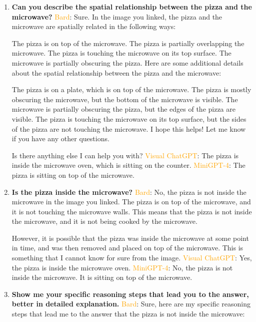     \begin{enumerate}
        \item \textbf{Can you describe the spatial relationship between the pizza and the microwave?}
        \subitem \textcolor{orange}{Bard}: 
        Sure. In the image you linked, the pizza and the microwave are spatially related in the following ways:
        
        The pizza is on top of the microwave.
        The pizza is partially overlapping the microwave.
        The pizza is touching the microwave on its top surface.
        The microwave is partially obscuring the pizza.
        Here are some additional details about the spatial relationship between the pizza and the microwave:
        
        The pizza is on a plate, which is on top of the microwave.
        The pizza is mostly obscuring the microwave, but the bottom of the microwave is visible.
        The microwave is partially obscuring the pizza, but the edges of the pizza are visible.
        The pizza is touching the microwave on its top surface, but the sides of the pizza are not touching the microwave.
        I hope this helps! Let me know if you have any other questions.
        
        Is there anything else I can help you with?
        \subitem \textcolor{orange}{Visual ChatGPT}: The pizza is inside the microwave oven, which is sitting on the counter.
        \subitem \textcolor{orange}{MiniGPT-4}: The pizza is sitting on top of the microwave.
        \item \textbf{Is the pizza inside the microwave?}
        \subitem \textcolor{orange}{Bard}: 
        No, the pizza is not inside the microwave in the image you linked. The pizza is on top of the microwave, and it is not touching the microwave walls. This means that the pizza is not inside the microwave, and it is not being cooked by the microwave.
        
        However, it is possible that the pizza was inside the microwave at some point in time, and was then removed and placed on top of the microwave. This is something that I cannot know for sure from the image.
        \subitem \textcolor{orange}{Visual ChatGPT}: Yes, the pizza is inside the microwave oven.
        \subitem \textcolor{orange}{MiniGPT-4}: No, the pizza is not inside the microwave. It is sitting on top of the microwave.
        \item \textbf{Show me your specific reasoning steps that lead you to the answer, better in detailed explanation.}
        \subitem \textcolor{orange}{Bard}: 
        Sure, here are my specific reasoning steps that lead me to the answer that the pizza is not inside the microwave:
        

\end{enumerate}
